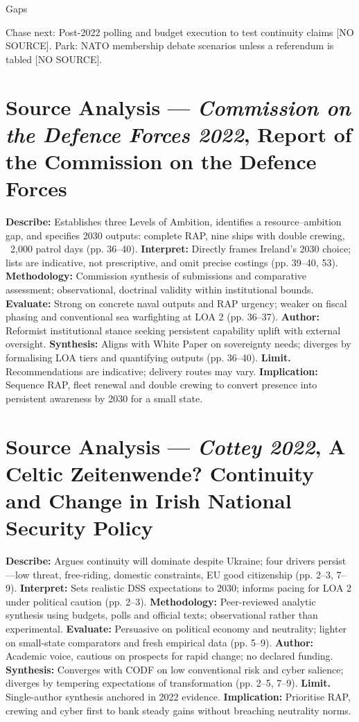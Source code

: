 Gaps

Chase next: Post-2022 polling and budget execution to test continuity claims [NO SOURCE].
Park: NATO membership debate scenarios unless a referendum is tabled [NO SOURCE].

\section*{Source Analysis — \textit{Commission on the Defence Forces 2022}, Report of the Commission on the Defence Forces}
\textbf{Describe:} Establishes three Levels of Ambition, identifies a resource–ambition gap, and specifies 2030 outputs: complete RAP, nine ships with double crewing, ~2,000 patrol days (pp. 36–40).
\textbf{Interpret:} Directly frames Ireland’s 2030 choice; lists are indicative, not prescriptive, and omit precise costings (pp. 39–40, 53).
\textbf{Methodology:} Commission synthesis of submissions and comparative assessment; observational, doctrinal validity within institutional bounds.
\textbf{Evaluate:} Strong on concrete naval outputs and RAP urgency; weaker on fiscal phasing and conventional sea warfighting at LOA 2 (pp. 36–37).
\textbf{Author:} Reformist institutional stance seeking persistent capability uplift with external oversight.
\textbf{Synthesis:} Aligns with White Paper on sovereignty needs; diverges by formalising LOA tiers and quantifying outputs (pp. 36–40).
\textbf{Limit.} Recommendations are indicative; delivery routes may vary.
\textbf{Implication:} Sequence RAP, fleet renewal and double crewing to convert presence into persistent awareness by 2030 for a small state.

\section*{Source Analysis — \textit{Cottey 2022}, A Celtic Zeitenwende? Continuity and Change in Irish National Security Policy}
\textbf{Describe:} Argues continuity will dominate despite Ukraine; four drivers persist—low threat, free-riding, domestic constraints, EU good citizenship (pp. 2–3, 7–9).
\textbf{Interpret:} Sets realistic DSS expectations to 2030; informs pacing for LOA 2 under political caution (pp. 2–3).
\textbf{Methodology:} Peer-reviewed analytic synthesis using budgets, polls and official texts; observational rather than experimental.
\textbf{Evaluate:} Persuasive on political economy and neutrality; lighter on small-state comparators and fresh empirical data (pp. 5–9).
\textbf{Author:} Academic voice, cautious on prospects for rapid change; no declared funding.
\textbf{Synthesis:} Converges with CODF on low conventional risk and cyber salience; diverges by tempering expectations of transformation (pp. 2–5, 7–9).
\textbf{Limit.} Single-author synthesis anchored in 2022 evidence.
\textbf{Implication:} Prioritise RAP, crewing and cyber first to bank steady gains without breaching neutrality norms.

